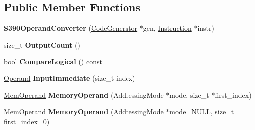 \subsection*{Public Member Functions}
\begin{DoxyCompactItemize}
\item 
{\bfseries S390\+Operand\+Converter} (\hyperlink{classv8_1_1internal_1_1compiler_1_1_code_generator}{Code\+Generator} $\ast$gen, \hyperlink{classv8_1_1internal_1_1compiler_1_1_instruction}{Instruction} $\ast$instr)\hypertarget{classv8_1_1internal_1_1compiler_1_1_s390_operand_converter_a7065541bfdc39cc9edadecbdf8d19b7a}{}\label{classv8_1_1internal_1_1compiler_1_1_s390_operand_converter_a7065541bfdc39cc9edadecbdf8d19b7a}

\item 
size\+\_\+t {\bfseries Output\+Count} ()\hypertarget{classv8_1_1internal_1_1compiler_1_1_s390_operand_converter_a668106c261477e4c00f0d71e12255f2d}{}\label{classv8_1_1internal_1_1compiler_1_1_s390_operand_converter_a668106c261477e4c00f0d71e12255f2d}

\item 
bool {\bfseries Compare\+Logical} () const \hypertarget{classv8_1_1internal_1_1compiler_1_1_s390_operand_converter_a1164c326058ee70ce763c2561e01868e}{}\label{classv8_1_1internal_1_1compiler_1_1_s390_operand_converter_a1164c326058ee70ce763c2561e01868e}

\item 
\hyperlink{classv8_1_1internal_1_1_operand}{Operand} {\bfseries Input\+Immediate} (size\+\_\+t index)\hypertarget{classv8_1_1internal_1_1compiler_1_1_s390_operand_converter_ac953dc032dff1eb74a43af55dd4482f9}{}\label{classv8_1_1internal_1_1compiler_1_1_s390_operand_converter_ac953dc032dff1eb74a43af55dd4482f9}

\item 
\hyperlink{classv8_1_1internal_1_1_mem_operand}{Mem\+Operand} {\bfseries Memory\+Operand} (Addressing\+Mode $\ast$mode, size\+\_\+t $\ast$first\+\_\+index)\hypertarget{classv8_1_1internal_1_1compiler_1_1_s390_operand_converter_a1eae44a408fa041d998ce3a1c1521fe4}{}\label{classv8_1_1internal_1_1compiler_1_1_s390_operand_converter_a1eae44a408fa041d998ce3a1c1521fe4}

\item 
\hyperlink{classv8_1_1internal_1_1_mem_operand}{Mem\+Operand} {\bfseries Memory\+Operand} (Addressing\+Mode $\ast$mode=N\+U\+LL, size\+\_\+t first\+\_\+index=0)\hypertarget{classv8_1_1internal_1_1compiler_1_1_s390_operand_converter_a3cf65ac2d1720152c374fb97ed929899}{}\label{classv8_1_1internal_1_1compiler_1_1_s390_operand_converter_a3cf65ac2d1720152c374fb97ed929899}


\end{DoxyCompactItemize}

